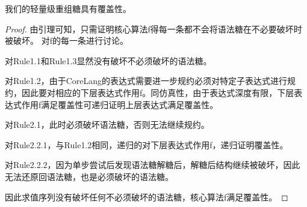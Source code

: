 \begin{mythm}[覆盖性]
	我们的轻量级重组糖具有覆盖性。
\end{mythm}

\begin{proof}
	由引理可知，只需证明核心算法f得每一条都不会将语法糖在不必要破坏时被破坏。
	对f的每一条进行讨论。
	
	对Rule1.1和Rule1.3显然没有破坏不必须破坏的语法糖。
	
	对Rule1.2，由于CoreLang的表达式需要进一步规约必须对特定子表达式进行规约，因此要对相应的下层表达式作用f。同仿真性，由于表达式深度有限，下层表达式作用f满足覆盖性可递归证明上层表达式满足覆盖性。
	
	对Rule2.1，此时必须破坏语法糖，否则无法继续规约。
	
	对Rule2.2.1，与Rule1.2相同，递归的对下层表达式作用f，递归证明覆盖性。
	
	对Rule2.2.2，因为单步尝试后发现语法糖解糖后，解糖后结构继续被破坏，因此无法还原回语法糖，也是必须破坏的语法糖。
	
	因此求值序列没有破坏任何不必须破坏的语法糖，核心算法f满足覆盖性。
\end{proof}



